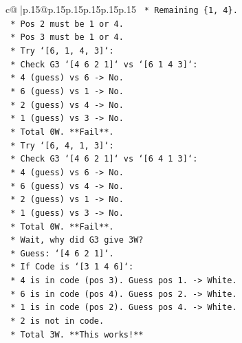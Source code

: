 \documentclass{article}
\begin{document}
{\begin{supertabular}{c@{$\;$}|p{.15\linewidth}@{}p{.15\linewidth}p{.15\linewidth}p{.15\linewidth}p{.15\linewidth}p{.15\linewidth}}
{{{\texttt{                    *   Remaining \{1, 4\}.} \\
\texttt{                    *   Pos 2 must be 1 or 4.} \\
\texttt{                    *   Pos 3 must be 1 or 4.} \\
\texttt{                    *   Try `{[}6, 1, 4, 3{]}`:} \\
\texttt{                        *   Check G3 `{[}4 6 2 1{]}` vs `{[}6 1 4 3{]}`:} \\
\texttt{                            *   4 (guess) vs 6 {-}> No.} \\
\texttt{                            *   6 (guess) vs 1 {-}> No.} \\
\texttt{                            *   2 (guess) vs 4 {-}> No.} \\
\texttt{                            *   1 (guess) vs 3 {-}> No.} \\
\texttt{                            *   Total 0W. **Fail**.} \\
\texttt{                    *   Try `{[}6, 4, 1, 3{]}`:} \\
\texttt{                        *   Check G3 `{[}4 6 2 1{]}` vs `{[}6 4 1 3{]}`:} \\
\texttt{                            *   4 (guess) vs 6 {-}> No.} \\
\texttt{                            *   6 (guess) vs 4 {-}> No.} \\
\texttt{                            *   2 (guess) vs 1 {-}> No.} \\
\texttt{                            *   1 (guess) vs 3 {-}> No.} \\
\texttt{                            *   Total 0W. **Fail**.} \\
\texttt{            *   Wait, why did G3 give 3W?} \\
\texttt{                *   Guess: `{[}4 6 2 1{]}`.} \\
\texttt{                *   If Code is `{[}3 1 4 6{]}`:} \\
\texttt{                    *   4 is in code (pos 3). Guess pos 1. {-}> White.} \\
\texttt{                    *   6 is in code (pos 4). Guess pos 2. {-}> White.} \\
\texttt{                    *   1 is in code (pos 2). Guess pos 4. {-}> White.} \\
\texttt{                    *   2 is not in code.} \\
\texttt{                    *   Total 3W. **This works!**} \\
}}}
\end{supertabular}}
\end{document}
